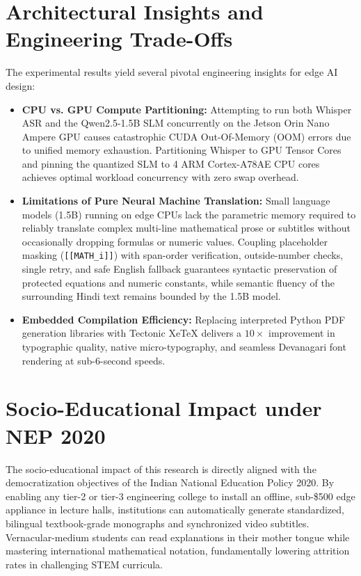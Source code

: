 \documentclass[11pt,a4paper,oneside]{report}
\begin{document}
\section{Architectural Insights and Engineering Trade-Offs}
The experimental results yield several pivotal engineering insights for edge AI design:
\begin{itemize}
    \item \textbf{CPU vs. GPU Compute Partitioning:} Attempting to run both Whisper ASR and the Qwen2.5-1.5B SLM concurrently on the Jetson Orin Nano Ampere GPU causes catastrophic CUDA Out-Of-Memory (OOM) errors due to unified memory exhaustion. Partitioning Whisper to GPU Tensor Cores and pinning the quantized SLM to 4 ARM Cortex-A78AE CPU cores achieves optimal workload concurrency with zero swap overhead.
    \item \textbf{Limitations of Pure Neural Machine Translation:} Small language models (1.5B) running on edge CPUs lack the parametric memory required to reliably translate complex multi-line mathematical prose or subtitles without occasionally dropping formulas or numeric values. Coupling placeholder masking (\texttt{[[MATH\_i]]}) with span-order verification, outside-number checks, single retry, and safe English fallback guarantees syntactic preservation of protected equations and numeric constants, while semantic fluency of the surrounding Hindi text remains bounded by the 1.5B model.
    \item \textbf{Embedded Compilation Efficiency:} Replacing interpreted Python PDF generation libraries with Tectonic XeTeX delivers a $10\times$ improvement in typographic quality, native micro-typography, and seamless Devanagari font rendering at sub-6-second speeds.
\end{itemize}

\section{Socio-Educational Impact under NEP 2020}
The socio-educational impact of this research is directly aligned with the democratization objectives of the Indian National Education Policy 2020. By enabling any tier-2 or tier-3 engineering college to install an offline, sub-\$500 edge appliance in lecture halls, institutions can automatically generate standardized, bilingual textbook-grade monographs and synchronized video subtitles. Vernacular-medium students can read explanations in their mother tongue while mastering international mathematical notation, fundamentally lowering attrition rates in challenging STEM curricula.
\end{document}
